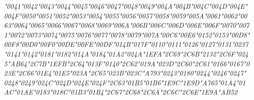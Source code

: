 {\LibertinusSerifPatch\itshape 
	\char"0041\gs \char"0042\gs \char"0043\gs \char"0044\gs \char"0045\gs \char"0046\gs \char"0047\gs \char"0048\gs \char"0049\gs \char"004A\gs \char"004B\gs \char"004C\gs \char"004D\gs \char"004E\gs \char"004F\gs \char"0050\gs \char"0051\gs \char"0052\gs \char"0053\gs \char"0054\gs \char"0055\gs \char"0056\gs \char"0057\gs \char"0058\gs \char"0059\gs \char"005A\gs \char"0061\gs \char"0062\gs \char"0063\gs \char"0064\gs \char"0065\gs \char"0066\gs \char"0067\gs \char"0068\gs \char"0069\gs \char"006A\gs \char"006B\gs \char"006C\gs \char"006D\gs \char"006E\gs \char"006F\gs \char"0070\gs \char"0071\gs \char"0072\gs \char"0073\gs \char"0074\gs \char"0075\gs \char"0076\gs \char"0077\gs \char"0078\gs \char"0079\gs \char"007A\gs \char"00C6\gs \char"00E6\gs \char"0152\gs \char"0153\gs \char"00D8\gs \char"00F8\gs \char"00D0\gs \char"00F0\gs \char"00DE\gs \char"00FE\gs \char"00DF\gs \char"014B\gs \char"017F\gs \char"0110\gs \char"0111\gs \char"0126\gs \char"0127\gs \char"0131\gs \char"0237\gs \char"0141\gs \char"0142\gs \char"0181\gs \char"0182\gs \char"014A\gs \char"0184\gs \char"01A2\gs \char"024A\gs \char"1EFA\gs \char"2C69\gs \char"2C6B\gs \char"2132\gs \char"2C6F\gs \char"0245\gs \char"AB64\gs \char"2C7B\gs \char"1EFB\gs \char"2C64\gs \char"013F\gs \char"0140\gs \char"2C62\gs \char"019A\gs \char"023D\gs \char"2C60\gs \char"2C61\gs \char"0166\gs \char"0167\gs \char"023E\gs \char"2C66\gs \char"01E4\gs \char"01E5\gs \char"023A\gs \char"2C65\gs \char"023B\gs \char"023C\gs \char"A793\gs \char"0243\gs \char"0180\gs \char"0244\gs \char"0246\gs \char"0247\gs \char"0248\gs \char"0249\gs \char"024C\gs \char"024D\gs \char"024E\gs \char"024F\gs \char"2C63\gs \char"01B5\gs \char"01B6\gs \char"1E9C\gs \char"1E9D\gs \char"A765\gs \char"01A4\gs \char"01AC\gs \char"01AE\gs \char"0183\gs \char"018C\gs \char"01B3\gs \char"01B4\gs \char"2C67\gs \char"2C68\gs \char"2C6A\gs \char"2C6C\gs \char"2C6E\gs \char"1E9A\gs \char"AB52\gs
}

